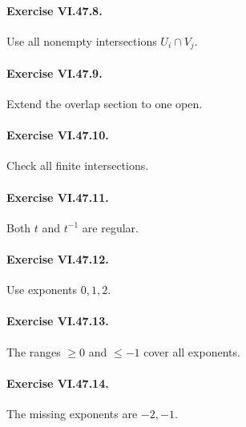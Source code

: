 \paragraph{Exercise VI.47.8.}
\begin{hint}
Use all nonempty intersections \(U_i\cap V_j\).
\end{hint}

\paragraph{Exercise VI.47.9.}
\begin{hint}
Extend the overlap section to one open.
\end{hint}

\paragraph{Exercise VI.47.10.}
\begin{hint}
Check all finite intersections.
\end{hint}

\paragraph{Exercise VI.47.11.}
\begin{hint}
Both \(t\) and \(t^{-1}\) are regular.
\end{hint}

\paragraph{Exercise VI.47.12.}
\begin{hint}
Use exponents \(0,1,2\).
\end{hint}

\paragraph{Exercise VI.47.13.}
\begin{hint}
The ranges \(\ge0\) and \(\le-1\) cover all exponents.
\end{hint}

\paragraph{Exercise VI.47.14.}
\begin{hint}
The missing exponents are \(-2,-1\).
\end{hint}

